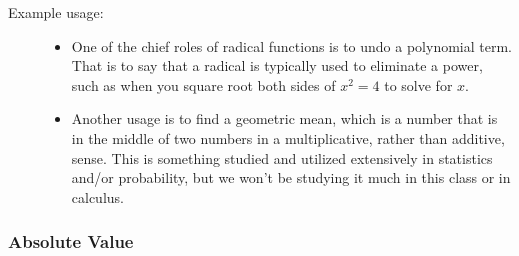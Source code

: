 \documentclass{ximera}
\begin{document}
\begin{description}
\begin{itemize}
            \end{itemize}
            \item[Example usage:]
            \begin{itemize}
                \item One of the chief roles of radical functions is to undo a polynomial term. That is to say that a radical is typically used to eliminate a power, such as when you square root both sides of $x^2 = 4$ to solve for $x$.
                \item Another usage is to find a geometric mean, which is a number that is in the middle of two numbers in a multiplicative, rather than additive, sense. This is something studied and utilized extensively in statistics and/or probability, but we won't be studying it much in this class or in calculus.
            \end{itemize}
        \end{description}




    \subsubsection*{Absolute Value}
        
\end{document}

